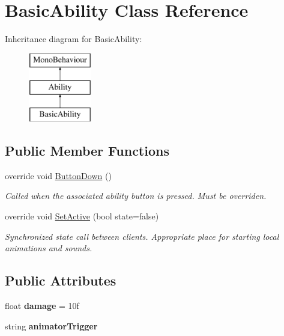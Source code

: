 \hypertarget{class_basic_ability}{}\section{Basic\+Ability Class Reference}
\label{class_basic_ability}
Inheritance diagram for Basic\+Ability\+:\begin{figure}[H]
\begin{center}
\leavevmode
\includegraphics[height=3.000000cm]{class_basic_ability}
\end{center}
\end{figure}
\subsection*{Public Member Functions}
\begin{DoxyCompactItemize}
\item 
override void \hyperlink{class_basic_ability_aec13c3d43d6690106f150026c59b63f0}{Button\+Down} ()
\begin{DoxyCompactList}\small\item\em Called when the associated ability button is pressed. Must be overriden. \end{DoxyCompactList}\item 
override void \hyperlink{class_basic_ability_a5aa77734c675136e256cab6ba16b850a}{Set\+Active} (bool state=false)
\begin{DoxyCompactList}\small\item\em Synchronized state call between clients. Appropriate place for starting local animations and sounds. \end{DoxyCompactList}\end{DoxyCompactItemize}
\subsection*{Public Attributes}
\begin{DoxyCompactItemize}
\item 
\hypertarget{class_basic_ability_a1153d05f050984979eb84c13ce8d016f}{}\label{class_basic_ability_a1153d05f050984979eb84c13ce8d016f} 
float {\bfseries damage} = 10f
\item 
\hypertarget{class_basic_ability_aa390f9d65a844de56d3cb7ae4e4cff33}{}\label{class_basic_ability_aa390f9d65a844de56d3cb7ae4e4cff33} 
string {\bfseries animator\+Trigger}
\end{DoxyCompactItemize}

